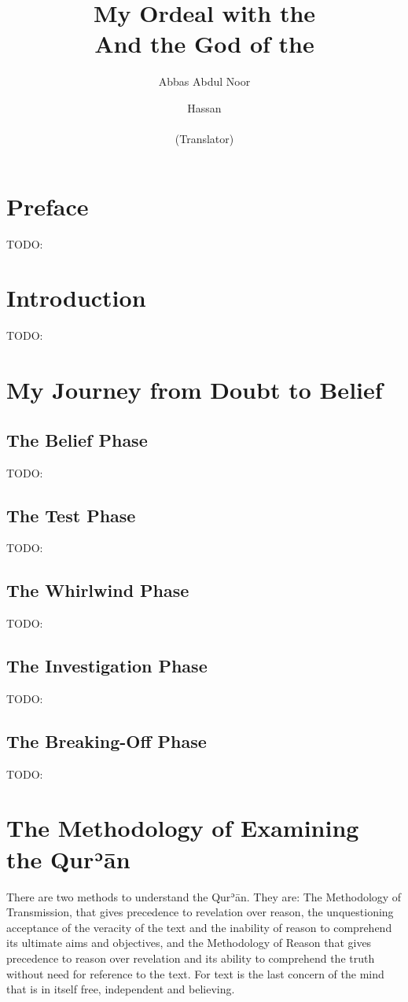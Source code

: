 \documentclass[12pt]{memoir}
\title{My Ordeal with the \Quran\\{\Large And the God of the \Quran}
\vskip 0.5cm
\ar{\Large \arabictitle}}
\author{Abbas Abdul Noor\\\ar{\abbasAr} \and
Hassan\\\ar{\hassanAr}\\{\small(Translator)}}
\def\´{ʾ} %
\def \Quran{Qur\-\´ān} %
\begin{document}
\frontmatter

\maketitle
\thispagestyle{empty}
\cleardoublepage

\setcounter{page}{1}
\tableofcontents

\chapter{Preface}
TODO:

\chapter{Introduction}
TODO:

\mainmatter


\chapter{My Journey from Doubt to Belief}

\section{The Belief Phase}
TODO:
\section{The Test Phase}
TODO:
\section{The Whirlwind Phase}
TODO:
\section{The Investigation Phase}
TODO:
\section{The Breaking-Off Phase}
TODO:

\chapter{The Methodology of Examining the \Quran}

There are two methods to understand the \Quran. They are: The Methodology of
Transmission, that gives precedence to revelation over reason, the
unquestioning acceptance of the veracity of the text and the inability of
reason to comprehend its ultimate aims and objectives, and the Methodology of
Reason that gives precedence to reason over revelation and its ability to
comprehend the truth without need for reference to the text. For text is the
last concern of the mind that is in itself free, independent and believing.
\end{document}
